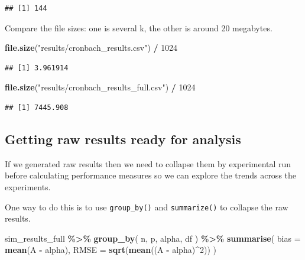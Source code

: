\documentclass[
]{book}
\newenvironment{Shaded}{\begin{snugshade}}{\end{snugshade}}
\newcommand{\AttributeTok}[1]{\textcolor[rgb]{0.13,0.29,0.53}{#1}}
\newcommand{\DecValTok}[1]{\textcolor[rgb]{0.00,0.00,0.81}{#1}}
\newcommand{\FunctionTok}[1]{\textcolor[rgb]{0.13,0.29,0.53}{\textbf{#1}}}
\newcommand{\NormalTok}[1]{#1}
\newcommand{\SpecialCharTok}[1]{\textcolor[rgb]{0.81,0.36,0.00}{\textbf{#1}}}
\newcommand{\StringTok}[1]{\textcolor[rgb]{0.31,0.60,0.02}{#1}}
\begin{document}
\begin{verbatim}
## [1] 144
\end{verbatim}

Compare the file sizes: one is several k, the other is around 20 megabytes.

\begin{Shaded}
\begin{Highlighting}[]
\FunctionTok{file.size}\NormalTok{(}\StringTok{"results/cronbach\_results.csv"}\NormalTok{) }\SpecialCharTok{/} \DecValTok{1024}
\end{Highlighting}
\end{Shaded}

\begin{verbatim}
## [1] 3.961914
\end{verbatim}

\begin{Shaded}
\begin{Highlighting}[]
\FunctionTok{file.size}\NormalTok{(}\StringTok{"results/cronbach\_results\_full.csv"}\NormalTok{) }\SpecialCharTok{/} \DecValTok{1024}
\end{Highlighting}
\end{Shaded}

\begin{verbatim}
## [1] 7445.908
\end{verbatim}

\subsection{Getting raw results ready for analysis}\label{getting-raw-results-ready-for-analysis}

If we generated raw results then we need to collapse them by experimental run
before calculating performance measures so we can explore the trends across the
experiments.

One way to do this is to use \texttt{group\_by()} and \texttt{summarize()} to collapse the raw results.

\begin{Shaded}
\begin{Highlighting}[]
\NormalTok{sim\_results\_full }\SpecialCharTok{\%\textgreater{}\%}
    \FunctionTok{group\_by}\NormalTok{( n, p, alpha, df ) }\SpecialCharTok{\%\textgreater{}\%}
  \FunctionTok{summarise}\NormalTok{( }
    \AttributeTok{bias =} \FunctionTok{mean}\NormalTok{(A }\SpecialCharTok{{-}}\NormalTok{ alpha),}
    \AttributeTok{RMSE =} \FunctionTok{sqrt}\NormalTok{(}\FunctionTok{mean}\NormalTok{((A }\SpecialCharTok{{-}}\NormalTok{ alpha)}\SpecialCharTok{\^{}}\DecValTok{2}\NormalTok{))}
\NormalTok{  )}
\end{Highlighting}
\end{Shaded}
\end{document}
